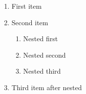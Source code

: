 \documentclass{article}
\begin{document}
\begin{enumerate}
\item First item
\item Second item
  \begin{enumerate}
  \item Nested first
  \item Nested second
  \item Nested third
  \end{enumerate}
\item Third item after nested
\end{enumerate}
\end{document}
